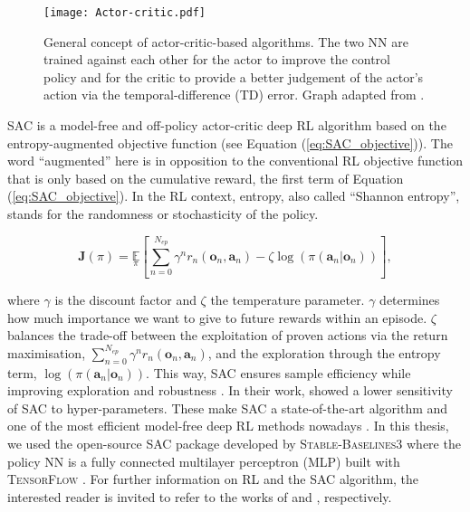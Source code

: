 \begin{figure}[!htbp]
\centering
\texttt{[image: Actor-critic.pdf]}
\caption{General concept of actor-critic-based algorithms. The two \gls{NN} are trained against each other for the actor to improve the control policy and for the critic to provide a better judgement of the actor's action via the temporal-difference (TD) error. Graph adapted from \cite{cao2020reinforcement}.}
\label{fig:Actor-critic}
\end{figure}

\gls{SAC} is a model-free and off-policy actor-critic deep \gls{RL} algorithm based on the entropy-augmented objective function (see Equation (\ref{eq:SAC_objective})). The word ``augmented'' here is in opposition to the conventional \gls{RL} objective function that is only based on the cumulative reward, \ie the first term of Equation (\ref{eq:SAC_objective}). In the \gls{RL} context, entropy, also called ``Shannon entropy'', stands for the randomness or stochasticity of the policy.

\begin{equation}
    \label{eq:SAC_objective}
    \bm{J}(\pi) = \underset{\pi}{\mathbb{E}}\left[\underset{n=0}{\overset{N_{ep}}{\sum}}\gamma^n r_n\left(\bm{o}_n,\bm{a}_n \right) - \zeta \log \left(\pi\left(\bm{a}_n | \bm{o}_n\right) \right) \right],
\end{equation}

\noindent
where $\gamma$ is the discount factor and $\zeta$ the temperature parameter. $\gamma$ determines how much importance we want to give to future rewards within an episode. $\zeta$ balances the trade-off between the exploitation of proven actions via the return maximisation, \ie $\sum_{n=0}^{N_{ep}}\gamma^n r_n\left(\bm{o}_n,\bm{a}_n \right)$, and the exploration through the entropy term, \ie $\log \left(\pi\left(\bm{a}_n | \bm{o}_n\right) \right)$. This way, \gls{SAC} ensures sample efficiency while improving exploration \cite{haarnoja2017reinforcement} and robustness \cite{ziebart2010modeling}. In their work, \citet{haarnoja2017reinforcement} showed a lower sensitivity of \gls{SAC} to hyper-parameters. These make \gls{SAC} a state-of-the-art algorithm and one of the most efficient model-free deep RL methods nowadays \cite{haarnoja2017reinforcement}. In this thesis, we used the open-source \gls{SAC} package developed by \textsc{Stable-Baselines3} \cite{raffin2021stable} where the policy \gls{NN} is a fully connected multilayer perceptron (MLP) built with \textsc{TensorFlow} \cite{abadi2016tensorflow}. For further information on \gls{RL} and the \gls{SAC} algorithm, the interested reader is invited to refer to the works of \citet{sutton2018reinforcement} and \citet{haarnoja2018soft}, respectively.

